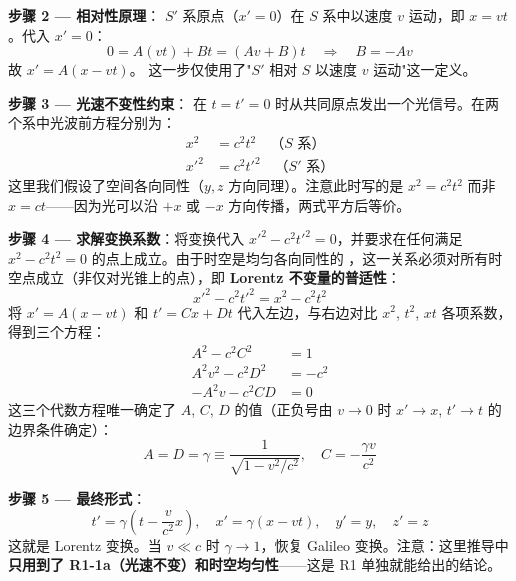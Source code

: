 \textbf{步骤 2 — 相对性原理}：\fbox{[N]} $S'$ 系原点（$x' = 0$）在 $S$ 系中以速度 $v$ 运动，即 $x = vt$。代入 $x' = 0$：
\begin{equation}
0 = A(vt) + B t = (Av + B)t \quad\Rightarrow\quad B = -Av
\end{equation}
故 $x' = A(x - vt)$。\fbox{[S]} 这一步仅使用了"$S'$ 相对 $S$ 以速度 $v$ 运动"这一定义。

\textbf{步骤 3 — 光速不变性约束}：\fbox{[N]}\fbox{[S]} 在 $t = t' = 0$ 时从共同原点发出一个光信号。在两个系中光波前方程分别为：
\begin{subequations}
\begin{align}
x^2 &= c^2 t^2 \quad \text{（$S$ 系）} \\
x'^2 &= c^2 t'^2 \quad \text{（$S'$ 系）}
\end{align}
\end{subequations}
这里我们假设了空间各向同性（$y,z$ 方向同理）。注意此时写的是 \textbf{$x^2 = c^2 t^2$} 而非 $x = ct$——因为光可以沿 $+x$ 或 $-x$ 方向传播，两式平方后等价。

\textbf{步骤 4 — 求解变换系数}：将变换代入 $x'^2 - c^2 t'^2 = 0$，并要求在任何满足 $x^2 - c^2 t^2 = 0$ 的点上成立。由于时空是均匀各向同性的 \fbox{[N]}，这一关系必须对所有时空点成立（非仅对光锥上的点），即 \textbf{Lorentz 不变量的普适性}：
\begin{equation}
x'^2 - c^2 t'^2 = x^2 - c^2 t^2
\end{equation}
将 $x' = A(x - vt)$ 和 $t' = Cx + Dt$ 代入左边，与右边对比 $x^2$, $t^2$, $xt$ 各项系数，得到三个方程：
\begin{align}
A^2 - c^2 C^2 &= 1 \label{eq:coeff1} \\
A^2 v^2 - c^2 D^2 &= -c^2 \label{eq:coeff2} \\
-A^2 v - c^2 CD &= 0 \label{eq:coeff3}
\end{align}
\fbox{[S]} 这三个代数方程唯一确定了 $A$, $C$, $D$ 的值（正负号由 $v \to 0$ 时 $x' \to x$, $t' \to t$ 的边界条件确定）：
\begin{equation}
A = D = \gamma \equiv \frac{1}{\sqrt{1 - v^2/c^2}}, \quad C = -\frac{\gamma v}{c^2}
\end{equation}

\textbf{步骤 5 — 最终形式}：
\begin{equation}
\boxed{t' = \gamma\left(t - \frac{v}{c^2}x\right), \quad x' = \gamma(x - vt), \quad y' = y, \quad z' = z}
\end{equation}
\fbox{[S]} 这就是 Lorentz 变换。当 $v \ll c$ 时 $\gamma \to 1$，恢复 Galileo 变换。注意：这里推导中 \textbf{只用到了 R1-1a（光速不变）和时空均匀性}——这是 R1 单独就能给出的结论。

